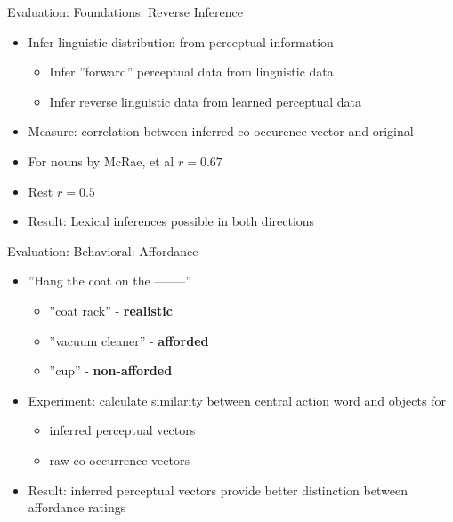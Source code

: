 \documentclass[12pt,a4paper]{beamer}
\begin{document}
\begin{frame}{Evaluation: Foundations: Reverse Inference}
\begin{itemize}
\item Infer linguistic distribution from perceptual information
    \begin{itemize}
    \item Infer ''forward'' perceptual data from linguistic data
    \item Infer reverse linguistic data from learned perceptual data
    \end{itemize}
\item Measure: correlation between inferred co-occurence vector and original
\item For nouns by McRae, et al $r = 0.67$
\item Rest $r = 0.5$
\item Result: Lexical inferences possible in both directions
\end{itemize}
\end{frame}


\begin{frame}{Evaluation: Behavioral: Affordance}
\begin{itemize}
\item ''Hang the coat on the --------''
    \begin{itemize}
    \item ''coat rack'' - \textbf{realistic}
    \item ''vacuum cleaner'' - \textbf{afforded}
    \item ''cup'' - \textbf{non-afforded}
    \end{itemize}
\item Experiment: calculate similarity between central action word and objects for
    \begin{itemize}
    \item inferred perceptual vectors
    \item raw co-occurrence vectors
    \end{itemize}
\item Result: inferred perceptual vectors provide better distinction between affordance ratings
\end{itemize}

\end{frame}
\end{document}
